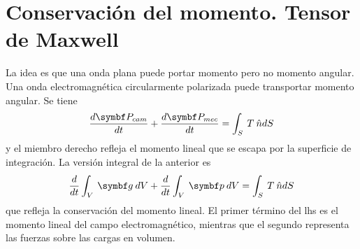 \documentclass[10pt,oneside]{CBFT_book}
\begin{document}
\section{Conservación del momento. Tensor de Maxwell}

La idea es que una onda plana puede portar momento pero no momento angular.
Una onda electromagnética circularmente polarizada puede transportar momento angular.
Se tiene
\[
	\dtot{\vb{P}_{cam}}{t} + \dtot{\vb{P}_{mec}}{t} = \int_S \: T \: \hat{n} dS
\]
y el miembro derecho refleja el momento lineal que se escapa por la superficie de
integración.
La versión integral de la anterior es
\[
	\dtot{}{t} \int_V \: \vb{g} \: dV + \dtot{}{t} \int_V \: \vb{p} \: dV = \int_S \: T \: \hat{n} dS
\]
que refleja la conservación del momento lineal. El primer término del lhs es el momento
lineal del campo electromagnético, mientras que el segundo representa las fuerzas sobre
las cargas en volumen.
\end{document}

